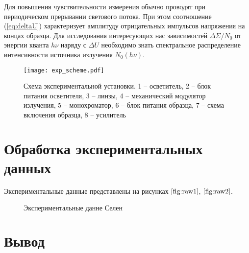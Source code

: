 \documentclass[a4paper, 14pt]{article}
\begin{document}
    Для повышения чувствительности измерения обычно проводят при периодическом прерывании светового потока. При этом соотношение (\ref{eq:deltaU}) характеризует амплитуду отрицательных импульсов напряжения на концах образца. Для исследования интересующих нас зависимостей $\Delta\Sigma/N_0$ от энергии кванта $h\nu$ наряду с $\Delta U$ необходимо знать спектральное распределение интенсивности источника излучения $N_0(h\nu)$.
    \begin{figure}[!htb]
        \centering
        \texttt{[image: exp\_scheme.pdf]}
        \caption{Схема экспериментальной установки. 1 -- осветитель, 2 -- блок питания осветителя, 3 -- линзы, 4 -- механический модулятор излучения, 5 -- монохроматор, 6 -- блок питания образца, 7 -- схема включения образца, 8 -- усилитель}
    \end{figure}

\section*{\textcolor{header}{Обработка экспериментальных данных}}

Экспериментальные данные представлены на рисунках $\ref{fig:raw1}$, $\ref{fig:raw2}$.
\begin{figure}[htbp]
    \centering
    
    \caption{Экспериментальные данне Селен}
    \label{<label>}
\end{figure}


\section*{\textcolor{header}{Вывод}}
\end{document}
